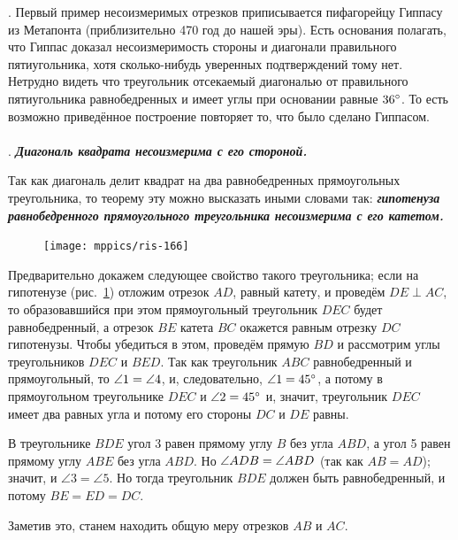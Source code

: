 \documentclass[twoside]{book}
\begin{document}
\smallskip
{.}
Первый пример несоизмеримых отрезков приписывается пифагорейцу Гиппасу из Метапонта (приблизительно 470 год до нашей эры).
Есть основания полагать, что Гиппас доказал несоизмеримость стороны и диагонали правильного пятиугольника, хотя сколько-нибудь уверенных подтверждений тому нет.
Нетрудно видеть что треугольник отсекаемый диагональю от правильного пятиугольника равнобедренных и имеет углы при основании равные $36\degree$.
То есть возможно приведённое построение повторяет то, что было сделано Гиппасом.


\paragraph{}\label{1938/149}
.
\textbf{\emph{Диагональ квадрата несоизмерима с его стороной.}}

Так как диагональ делит квадрат на два равнобедренных прямоугольных треугольника, то теорему эту можно высказать иными словами так:
\textbf{\emph{гипотенуза равнобедренного прямоугольного треугольника несоизмерима с его катетом.}}

\begin{figure}
\centering
\texttt{[image: mppics/ris-166]}
\caption{}\label{1938/ris-166}
\end{figure}

Предварительно докажем следующее свойство такого треугольника;
если на гипотенузе (рис.~\ref{1938/ris-166}) отложим отрезок $AD$, равный катету, и проведём $DE\perp AC$, то образовавшийся при этом прямоугольный треугольник $DEC$ будет равнобедренный, а отрезок $BE$ катета $BC$ окажется равным отрезку $DC$ гипотенузы.
Чтобы убедиться в этом, проведём прямую $BD$ и рассмотрим углы треугольников $DEC$ и $BED$.
Так как треугольник $ABC$ равнобедренный и прямоугольный, то $\angle 1 \z= \angle 4$, и, следовательно, $\angle 1 \z= 45\degree$, а потому в прямоугольном треугольнике $DEC$ и $\angle 2 = 45\degree$ и, значит, треугольник $DEC$ имеет два равных угла и потому его стороны $DC$ и $DE$ равны.



В треугольнике $BDE$ угол 3 равен прямому углу $B$ без угла $ABD$, а угол 5 равен прямому углу $ABE$ без угла $ABD$.
Но $\angle ADB \z= \angle ABD$ (так как $AB=AD$);
значит, и $\angle 3 = \angle 5$.
Но тогда треугольник $BDE$ должен быть равнобедренный, и потому $BE=ED=DC$.

Заметив это, станем находить общую меру отрезков $AB$ и $AC$.
\end{document}
